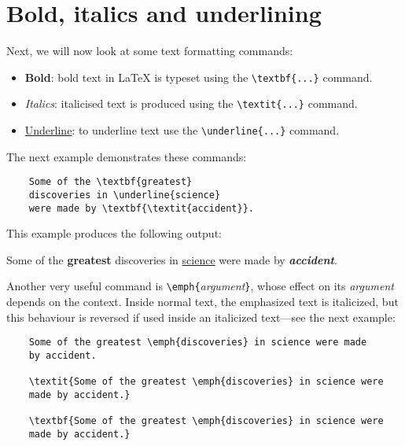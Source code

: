 \section{Bold, italics and underlining}

Next, we will now look at some text formatting commands:

\begin{itemize}
    \item \textbf{Bold}: bold text in LaTeX is typeset using the \verb|\textbf{...}| command.
    \item \textit{Italics}: italicised text is produced using the \verb|\textit{...}| command.
    \item \underline{Underline}: to underline text use the \verb|\underline{...}| command.
\end{itemize}

The next example demonstrates these commands:

\begin{tcolorbox}
\begin{verbatim}
    Some of the \textbf{greatest}
    discoveries in \underline{science} 
    were made by \textbf{\textit{accident}}.
\end{verbatim}
\end{tcolorbox}

This example produces the following output:

\begin{mdframed}
\-\hspace{20pt}Some of the \textbf{greatest} discoveries in \underline{science} were made by \textbf{\textit{accident}}.
\end{mdframed}

Another very useful command is \verb|\emph{|\emph{argument}\verb|}|, whose effect on its \emph{argument} depends on the context. Inside normal text, the emphasized text is italicized, but this behaviour is reversed if used inside an italicized text—see the next example:

\begin{tcolorbox}
\begin{verbatim}
    Some of the greatest \emph{discoveries} in science were made 
    by accident.

    \textit{Some of the greatest \emph{discoveries} in science were 
    made by accident.}

    \textbf{Some of the greatest \emph{discoveries} in science were 
    made by accident.}
\end{verbatim}
\end{tcolorbox}

